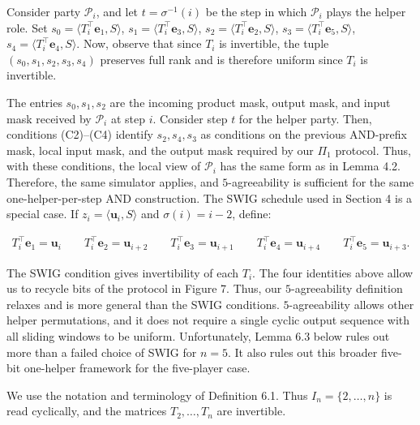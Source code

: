 \documentclass[10pt,a4paper]{article}
\begin{document}
Consider party $\mathcal{P}_{i}$, and let $t=\sigma^{-1}(i)$ be the step in which
$\mathcal{P}_{i}$ plays the helper role. Set
$s_{0}=\langle T_{i}^{\top}\mathbf{e}_{1},S\rangle$,
$s_{1}=\langle T_{i}^{\top}\mathbf{e}_{3},S\rangle$,
$s_{2}=\langle T_{i}^{\top}\mathbf{e}_{2},S\rangle$,
$s_{3}=\langle T_{i}^{\top}\mathbf{e}_{5},S\rangle$,
$s_{4}=\langle T_{i}^{\top}\mathbf{e}_{4},S\rangle$.
Now, observe that since $T_{i}$ is invertible, the tuple
$(s_{0},s_{1},s_{2},s_{3},s_{4})$ preserves full rank and is therefore uniform since $T_{i}$ is invertible.\par




The entries $s_{0},s_{1},s_{2}$ are the incoming product mask, output mask, and input
mask received by $\mathcal{P}_{i}$ at step $i$. Consider step $t$ for the helper party. Then, conditions
(C2)–(C4) identify $s_{2},s_{4},s_{3}$ as conditions on the previous AND-prefix mask, local input mask, and the output
mask required by our $\Pi_{1}$ protocol. Thus, with these conditions, the local view of $\mathcal{P}_{i}$ has the same
form as in Lemma 4.2. Therefore, the same simulator applies, and
$5$-agreeability is sufficient for the same one-helper-per-step AND
construction.
The SWIG schedule used in Section 4 is a special case. If $z_{i}=\langle\mathbf{u}_{i},S\rangle$ and $\sigma(i)=i-2$, define:\par


\[\begin{gathered}
T_{i}^{\top}\mathbf{e}_{1}=\mathbf{u}_{i}\qquad T_{i}^{\top}\mathbf{e}_{2}=\mathbf{u}_{i+2}\qquad T_{i}^{\top}\mathbf{e}_{3}=\mathbf{u}_{i+1}\qquad T_{i}^{\top}\mathbf{e}_{4}=\mathbf{u}_{i+4}\qquad T_{i}^{\top}\mathbf{e}_{5}=\mathbf{u}_{i+3}.
\end{gathered}\]




The SWIG condition gives invertibility of each $T_{i}$. The four identities above allow us to recycle bits of the protocol in Figure 7. Thus, our $5$-agreeability definition relaxes and is more general than the SWIG conditions. $5$-agreeability allows other helper permutations, and it does not require a single cyclic output sequence with all sliding windows to be uniform. Unfortunately, Lemma 6.3 below rules out more than a failed choice of SWIG for $n=5$. It also rules out this broader five-bit one-helper framework for the five-player case.\par




We use the notation and terminology of Definition 6.1. Thus $I_{n}=\{2,\ldots,n\}$ is read cyclically, and the matrices $T_{2},\ldots,T_{n}$ are invertible.\par
\end{document}
